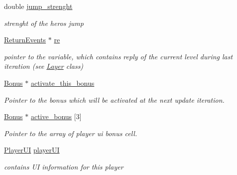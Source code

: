 \begin{DoxyCompactItemize}
\mbox{\label{class_player_aadeca24363f2fb5d9206a2cf9c552c20}} 
double \hyperlink{class_player_aadeca24363f2fb5d9206a2cf9c552c20}{jump\+\_\+strenght}
\begin{DoxyCompactList}\small\item\em strenght of the heros jump \end{DoxyCompactList}\item 
\mbox{\label{class_player_a652a51b511e40c14cd43c906693670f6}} 
\hyperlink{_events_8h_a51620cf702f1b8fdf47cd0a5cfa0ba4f}{Return\+Events} $\ast$ \hyperlink{class_player_a652a51b511e40c14cd43c906693670f6}{re}
\begin{DoxyCompactList}\small\item\em pointer to the variable, which contains reply of the current level during last iteration (see \hyperlink{class_layer}{Layer} class) \end{DoxyCompactList}\item 
\mbox{\label{class_player_ac1b10a27f5fac807cd2a2ff00018b18d}} 
\hyperlink{class_bonus}{Bonus} $\ast$ \hyperlink{class_player_ac1b10a27f5fac807cd2a2ff00018b18d}{activate\+\_\+this\+\_\+bonus}
\begin{DoxyCompactList}\small\item\em Pointer to the bonus which will be activated at the next update iteration. \end{DoxyCompactList}\item 
\mbox{\label{class_player_aa9320da45054e6196476c46b9b0ac794}} 
\hyperlink{class_bonus}{Bonus} $\ast$ \hyperlink{class_player_aa9320da45054e6196476c46b9b0ac794}{active\+\_\+bonus} \mbox{[}3\mbox{]}
\begin{DoxyCompactList}\small\item\em Pointer to the array of player ui bonus cell. \end{DoxyCompactList}\item 
\mbox{\label{class_player_a31637dcf493a77b73258e87641b339d4}} 
\hyperlink{class_player_u_i}{Player\+UI} \hyperlink{class_player_a31637dcf493a77b73258e87641b339d4}{player\+UI}
\begin{DoxyCompactList}\small\item\em contains UI information for this player \end{DoxyCompactList}\end{DoxyCompactItemize}


